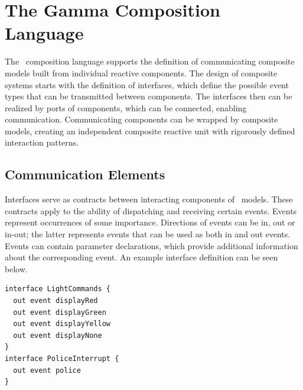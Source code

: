 %
%

\section{The Gamma Composition Language}
\label{sec:composition-language}
The \gamma\ composition language supports the definition of communicating composite models
built from individual reactive components. The design of composite systems starts with the definition of interfaces, which define the possible event types that can be transmitted between components. The interfaces then can be realized by ports of components, which can be connected, enabling communication. Communicating components can be wrapped by composite models, creating an independent composite reactive unit with rigorously defined interaction patterns.

\subsection{Communication Elements}
\label{sec:communication-elements}
Interfaces serve as contracts between
interacting components of \gamma\ models. These contracts apply to the ability of dispatching
and receiving certain events. Events represent occurrences of some importance. Directions of events can be in, out or in-out;
the latter represents events that can be used as both in and out events. Events can contain
parameter declarations, which provide additional information about the corresponding event. An example interface definition can be seen below.
\begin{lstlisting}
interface LightCommands {
  out event displayRed
  out event displayGreen
  out event displayYellow
  out event displayNone
}
interface PoliceInterrupt {
  out event police
}
\end{lstlisting}

